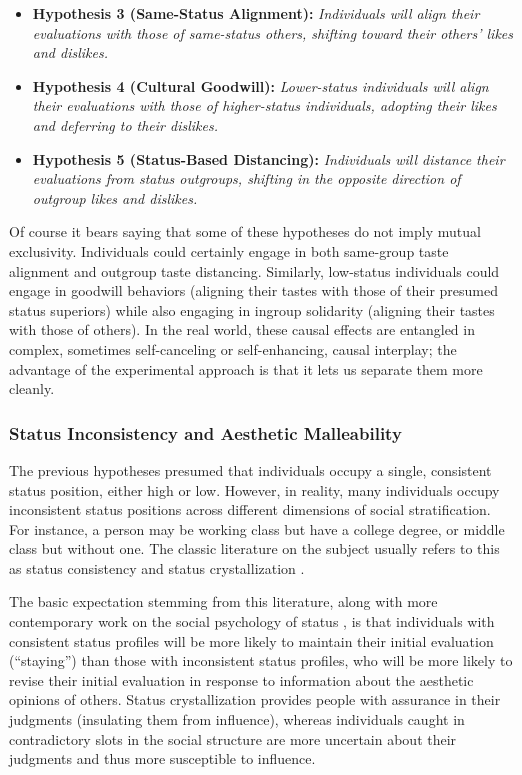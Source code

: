 \documentclass[12pt, letterpaper]{article}
\begin{document}
\begin{itemize}
\item \textbf{Hypothesis 3 (Same-Status Alignment):} \textit{Individuals will align their evaluations with those of same-status others, shifting toward their others' likes and dislikes.}
\item \textbf{Hypothesis 4 (Cultural Goodwill):} \textit{Lower-status individuals will align their evaluations with those of higher-status individuals, adopting their likes and deferring to their dislikes.}
\item \textbf{Hypothesis 5 (Status-Based Distancing):} \textit{Individuals will distance their evaluations from status outgroups, shifting in the opposite direction of outgroup likes and dislikes.}
\end{itemize}

Of course it bears saying that some of these hypotheses do not imply mutual exclusivity. Individuals could certainly engage in both same-group taste alignment and outgroup taste distancing. Similarly, low-status individuals could engage in goodwill behaviors (aligning their tastes with those of their presumed status superiors) while also engaging in ingroup solidarity (aligning their tastes with those of others). In the real world, these causal effects are entangled in complex, sometimes self-canceling or self-enhancing, causal interplay; the advantage of the experimental approach is that it lets us separate them more cleanly.

\subsubsection{Status Inconsistency and Aesthetic Malleability}

The previous hypotheses presumed that individuals occupy a single, consistent status position, either high or low. However, in reality, many individuals occupy inconsistent status positions across different dimensions of social stratification. For instance, a person may be working class but have a college degree, or middle class but without one. The classic literature on the subject usually refers to this as status consistency and status crystallization \citep{hope1975models}. 

The basic expectation stemming from this literature, along with more contemporary work on the social psychology of status \citep{correll2003expectations}, is that individuals with consistent status profiles will be more likely to maintain their initial evaluation (``staying'') than those with inconsistent status profiles, who will be more likely to revise their initial evaluation in response to information about the aesthetic opinions of others. Status crystallization provides people with assurance in their judgments (insulating them from influence), whereas individuals caught in contradictory slots in the social structure are more uncertain about their judgments and thus more susceptible to influence.
\end{document}
